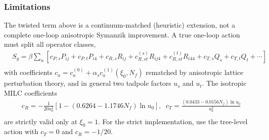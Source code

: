 \subsubsection{\label{sec:AnisoOneLoopCaveat}Limitations}

The twisted term above is a continuum-matched (heuristic) extension, not a complete one-loop anisotropic Symanzik improvement. A true one-loop action must split all operator classes,
\begin{equation}
\begin{split}
&S_g=\beta \sum _n\left[c_{P,s}P_{ij}+c_{P,t}P_{i4}+c_{R,s}R_{ij}+c_{R,st}^{(s)}R_{ij4}+c_{R,st}^{(t)}R_{i44}+c_{T,s}Q_s+c_{T,t}Q_t+\cdots \right]\\
\end{split}
\end{equation}
with coefficients $c_a=c_a^{(0)}+\alpha _s c_a^{(1)}(\xi _0,N_f)$ rematched by anisotropic lattice perturbation theory, and in general two tadpole factors $u_s$ and $u_t$. The isotropic MILC coefficients
\begin{equation}
\begin{split}
&c_R=-\frac{1}{20u_0^2}\left[1-(0.6264-1.1746N_f)\ln u_0\right],\;\;c_T=\frac{(0.0433-0.0156N_f)\ln u_0}{u_0^2}\\
\end{split}
\end{equation}
are strictly valid only at $\xi _0=1$. For the strict implementation, use the tree-level action with $c_T=0$ and $c_R=-1/20$.
